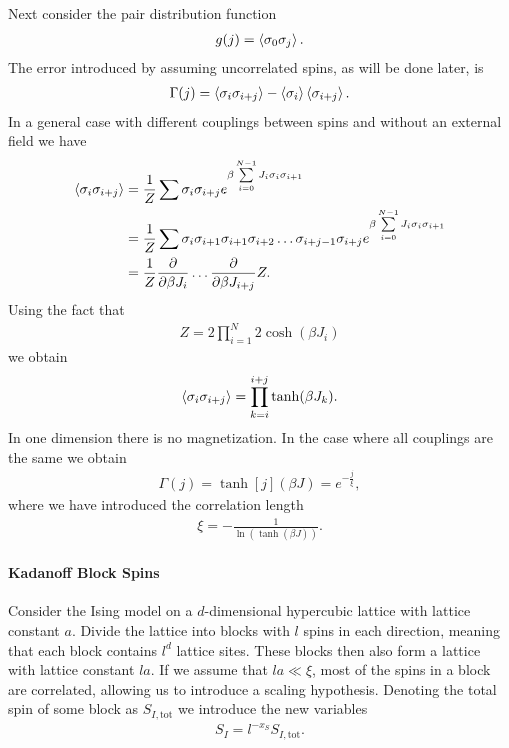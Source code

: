 Next consider the pair distribution function
\begin{align*}
	g(j) = \expval{\sigma_{0}\sigma_{j}}.
\end{align*}
The error introduced by assuming uncorrelated spins, as will be done later, is
\begin{align*}
	\Gamma(j) = \expval{\sigma_{i}\sigma_{i + j}} - \expval{\sigma_{i}}\expval{\sigma_{i + j}}.
\end{align*}
In a general case with different couplings between spins and without an external field we have
\begin{align*}
	\expval{\sigma_{i}\sigma_{i + j}} &= \frac{1}{Z}\sum\sigma_{i}\sigma_{i + j}e^{\beta \sum\limits_{i = 0}^{N - 1}J_{i}\sigma_{i}\sigma_{i + 1}} \\
	                                  &= \frac{1}{Z}\sum\sigma_{i}\sigma_{i + 1}\sigma_{i + 1}\sigma_{i + 2}\dots\sigma_{i + j - 1}\sigma_{i + j}e^{\beta \sum\limits_{i = 0}^{N - 1}J_{i}\sigma_{i}\sigma_{i + 1}} \\
	                                  &= \frac{1}{Z}\pdv{\beta J_{i}}\dots\pdv{\beta J_{i + j}}Z.
\end{align*}
Using the fact that
\begin{align*}
	Z = 2\prod\limits_{i = 1}^{N}2\cosh(\beta J_{i})
\end{align*}
we obtain
\begin{align*}
	\expval{\sigma_{i}\sigma_{i + j}} = \prod\limits_{k = i}^{i + j}\tanh(\beta J_{k}).
\end{align*}
In one dimension there is no magnetization. In the case where all couplings are the same we obtain
\begin{align*}
	\Gamma(j) = \tanh[j](\beta J) = e^{-\frac{j}{\xi}},
\end{align*}
where we have introduced the correlation length
\begin{align*}
	\xi = -\frac{1}{\ln(\tanh(\beta J))}.
\end{align*}

\paragraph{Kadanoff Block Spins}
Consider the Ising model on a $d$-dimensional hypercubic lattice with lattice constant $a$. Divide the lattice into blocks with $l$ spins in each direction, meaning that each block contains $l^{d}$ lattice sites. These blocks then also form a lattice with lattice constant $la$. If we assume that $la \ll \xi$, most of the spins in a block are correlated, allowing us to introduce a scaling hypothesis. Denoting the total spin of some block as $S_{I, \text{tot}}$ we introduce the new variables
\begin{align*}
	S_{I} = l^{-x_{S}}S_{I, \text{tot}}.
\end{align*}

